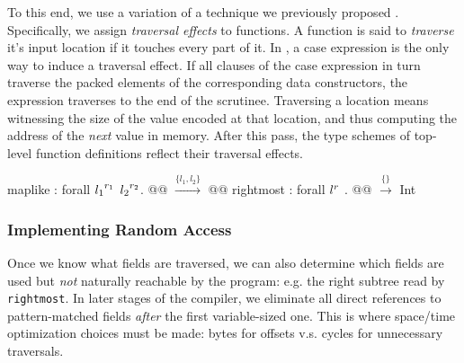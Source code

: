 \documentclass[showabstract,showacknowledgments,showpreface,showdedication]{iuphd}
\theoremstyle{nonumberplain}
\newcommand{\il}[1]{\lstinline[style=inline,mathescape=true];#1;}
\begin{document}
To this end, we use a variation of a technique we previously proposed
\cite{ecoop17-gibbon}.  Specifically, we assign \emph{traversal effects} to
functions.  A function is said to {\em traverse} it's input location if it
touches every part of it.  In \ourcalc{}, a case expression is the only way to
induce a traversal effect.  If all clauses of the case expression in turn
traverse the packed elements of the corresponding data constructors, the
expression traverses to the end of the scrutinee.
%
Traversing a location means witnessing the size of the value encoded at that
location, and thus computing the address of the \emph{next} value in memory.
%
After this pass, the type schemes of top-level function definitions reflect
their traversal effects.


\begin{code}
maplike : forall ${l_1}^{r_1}$ ${l_2}^{r_2}$. @@ $\xrightarrow{\{ l_1, l_2 \}}$ @@
rightmost : forall ${l}^{r}$ . @@ $\xrightarrow{\{\}}$ Int
\end{code}

\subsubsection{Implementing Random Access}
\label{sec:rand-access}

Once we know what fields are traversed, we can also determine which fields are
used but \emph{not} naturally reachable by the program: e.g. the right subtree
read by \il{rightmost}.
%
In later stages of the compiler, we eliminate all direct references to
pattern-matched fields {\em after} the first variable-sized one.
%
This is where space/time optimization choices must be made:
bytes for offsets v.s. cycles for unnecessary traversals.
\end{document}
